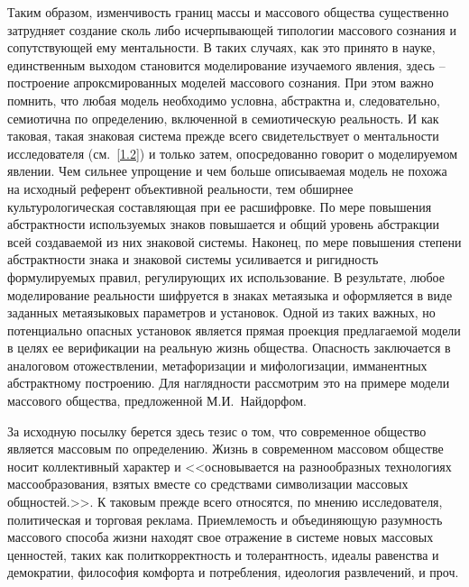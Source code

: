 Таким образом, изменчивость границ массы и массового общества существенно затрудняет создание сколь
либо исчерпывающей типологии массового сознания и сопутствующей ему ментальности. В таких случаях,
как это принято в науке, единственным выходом становится моделирование изучаемого явления, здесь --
построение апроксмированных моделей массового сознания. При этом важно помнить, что любая модель
необходимо условна, абстрактна и, следовательно, семиотична по определению, включенной в семиотическую реальность.
И как таковая, такая знаковая система прежде всего свидетельствует о ментальности исследователя (см.~\ref{1.2}) и
только затем, опосредованно говорит о моделируемом явлении.
Чем сильнее упрощение и чем больше описываемая модель не похожа на исходный референт объективной реальности,
тем обширнее культурологическая составляющая при ее расшифровке. По мере повышения абстрактности используемых
знаков повышается и общий уровень абстракции всей создаваемой из них знаковой системы. Наконец, по мере
повышения степени абстрактности знака и знаковой системы усиливается и ригидность формулируемых правил,
регулирующих их использование. В результате, любое моделирование реальности шифруется в знаках метаязыка и
оформляется в виде заданных метаязыковых параметров и установок. Одной из таких важных, но потенциально опасных
установок является прямая проекция предлагаемой модели в целях ее верификации на реальную жизнь общества.
Опасность заключается в аналоговом отожествлении, метафоризации и мифологизации, имманентных абстрактному
построению. Для наглядности рассмотрим это на примере модели массового общества, предложенной М.И.~Найдорфом\autocite{ocherki}.

За исходную посылку берется здесь тезис о том, что современное общество является массовым по определению.
Жизнь в современном массовом обществе носит коллективный характер и <<основывается на разнообразных технологиях
массообразования, взятых вместе со средствами символизации массовых общностей.>>\autocite{ocherki}.
К таковым прежде всего относятся, по мнению исследователя, политическая и торговая реклама. Приемлемость
и объединяющую разумность массового способа жизни находят свое отражение в системе новых массовых
ценностей, таких как политкорректность и толерантность, идеалы равенства и демократии, философия комфорта
и потребления, идеология развлечений, и проч.

